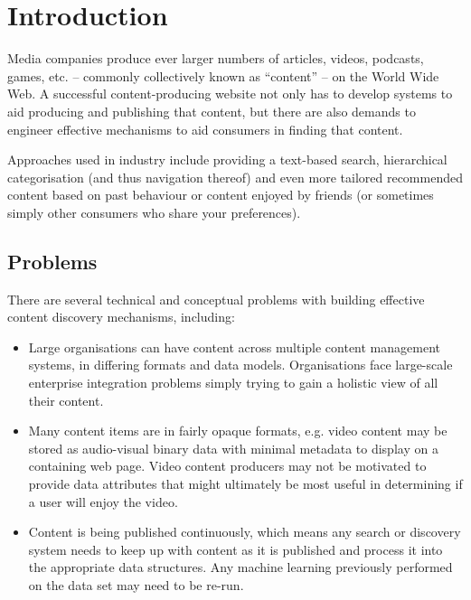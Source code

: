 \chapter{Introduction}
\label{chp:intro}

Media companies produce ever larger numbers of articles, videos,
podcasts, games, etc. -- commonly collectively known as ``content'' --
on the World Wide Web. A successful content-producing website not only
has to develop systems to aid producing and publishing that content,
but there are also demands to engineer effective mechanisms to aid
consumers in finding that content.

Approaches used in industry include providing a text-based search,
hierarchical categorisation (and thus navigation thereof) and even
more tailored recommended content based on past behaviour or content
enjoyed by friends (or sometimes simply other consumers who share your
preferences).

\section{Problems}
\label{sec:intro-problems}

There are several technical and conceptual problems with building
effective content discovery mechanisms, including:

\begin{itemize}

\item Large organisations can have content across multiple content
  management systems, in differing formats and data models.
  Organisations face large-scale enterprise integration problems
  simply trying to gain a holistic view of all their content.

\item Many content items are in fairly opaque formats, e.g. video
  content may be stored as audio-visual binary data with minimal
  metadata to display on a containing web page. Video content
  producers may not be motivated to provide data attributes that might
  ultimately be most useful in determining if a user will enjoy the
  video.

\item Content is being published continuously, which means any search
  or discovery system needs to keep up with content as it is published
  and process it into the appropriate data structures. Any machine
  learning previously performed on the data set may need to be re-run.

\end{itemize}

